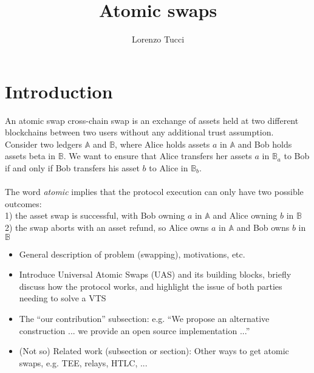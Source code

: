 \documentclass{article}      	%
\begin{document}
         
\author{Lorenzo Tucci}
\title{Atomic swaps}

\maketitle

\tableofcontents
\section{Introduction}

An atomic swap cross-chain swap is an exchange of assets held at two different blockchains between two users without any additional trust assumption. \\
Consider two ledgers $\mathbb{A}$ and $\mathbb{B}$, where Alice holds assets $a$ in $\mathbb{A}$ and Bob holds assets beta in $\mathbb{B}$. We want to ensure that Alice transfers her assets $a$ in $\mathbb{B}_a$ to Bob if and only if Bob transfers his asset $b$ to Alice in $\mathbb{B}_b$. \\
\\
The word \textit{atomic} implies that the protocol execution can only have two possible outcomes: \\
1) the asset swap is successful, with Bob owning $a$ in $\mathbb{A}$ and Alice owning $b$ in $\mathbb{B}$ \\
2) the swap aborts with an asset refund, so Alice owns $a$ in $\mathbb{A}$ and Bob owns $b$ in $\mathbb{B}$ \\

\begin{itemize}
\item General description of problem (swapping), motivations, etc.
\item Introduce Universal Atomic Swaps (UAS) and its building blocks, briefly discuss how the protocol works, and highlight the issue of both parties needing to solve a VTS
\item The ``our contribution'' subsection: e.g. ``We propose an alternative construction ... we provide an open source implementation ...''
\item (Not so) Related work (subsection or section): Other ways to get atomic swaps, e.g. TEE, relays, HTLC, ...
\end{itemize}



\end{document}
